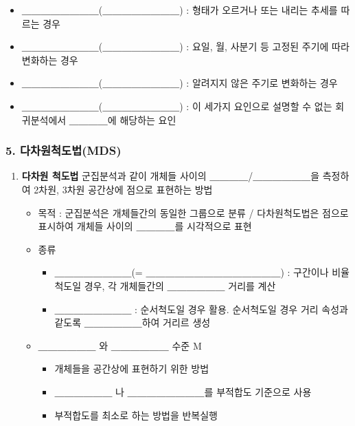 \documentclass[11pt]{article}
\providecommand{\tightlist}{%
      \setlength{\itemsep}{0pt}\setlength{\parskip}{0pt}}
\begin{document}
\begin{enumerate}
\begin{itemize}
    \begin{itemize}
    \tightlist
    \item
      ＿＿＿＿＿＿＿＿(＿＿＿＿＿＿＿＿) : 형태가 오르거나 또는 내리는
      추세를 따르는 경우
    \item
      ＿＿＿＿＿＿＿＿(＿＿＿＿＿＿＿＿) : 요일, 월, 사분기 등 고정된
      주기에 따라 변화하는 경우
    \item
      ＿＿＿＿＿＿＿＿(＿＿＿＿＿＿＿＿) : 알려지지 않은 주기로 변화하는
      경우
    \item
      ＿＿＿＿＿＿＿＿(＿＿＿＿＿＿＿＿) : 이 세가지 요인으로 설명할 수
      없는 회귀분석에서 ＿＿＿＿에 해당하는 요인
    \end{itemize}
  \end{itemize}
\end{enumerate}

    \hypertarget{uxb2e4uxcc28uxc6d0uxcc99uxb3c4uxbc95mds}{%
\subsubsection{5.
다차원척도법(MDS)}\label{uxb2e4uxcc28uxc6d0uxcc99uxb3c4uxbc95mds}}

\begin{enumerate}
\def\labelenumi{\arabic{enumi}.}
\item
  \textbf{다차원 척도법} 군집분석과 같이 개체들 사이의
  ＿＿＿＿/＿＿＿＿＿＿을 측정하여 2차원, 3차원 공간상에 점으로 표현하는
  방법

  \begin{itemize}
  \tightlist
  \item
    목적 : 군집분석은 개체들간의 동일한 그룹으로 분류 / 다차원척도법은
    점으로 표시하여 개체들 사이의 ＿＿＿＿를 시각적으로 표현
  \item
    종류

    \begin{itemize}
    \tightlist
    \item
      ＿＿＿＿＿＿＿＿(= ＿＿＿＿＿＿＿＿＿＿＿＿＿＿) : 구간이나
      비율척도일 경우, 각 개체들간의 ＿＿＿＿＿＿ 거리를 계산
    \item
      ＿＿＿＿＿＿＿＿ : 순서척도일 경우 활용. 순서척도일 경우 거리
      속성과 같도록 ＿＿＿＿＿＿하여 거리르 생성
    \end{itemize}
  \item
    ＿＿＿＿＿＿ 와 ＿＿＿＿＿＿ 수준 M

    \begin{itemize}
    \tightlist
    \item
      개체들을 공간상에 표현하기 위한 방법
    \item
      ＿＿＿＿＿＿ 나 ＿＿＿＿＿＿＿＿를 부적합도 기준으로 사용
    \item
      부적합도를 최소로 하는 방법을 반복실행
    \end{itemize}
  \end{itemize}
\end{enumerate}
\end{document}
